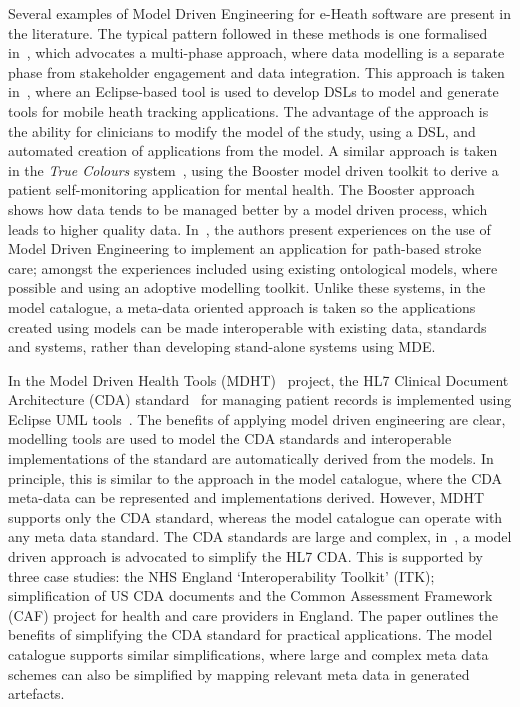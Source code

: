 Several examples of Model Driven Engineering for e-Heath software are present in the literature. The typical pattern followed in these methods is one formalised in~\cite{pay12}, which advocates a multi-phase approach, where data modelling is a separate phase from stakeholder engagement and data integration. This approach is taken in~\cite{kham08}, where an Eclipse-based tool is used to develop DSLs to model and generate tools for mobile heath tracking applications. The advantage of the approach is the ability for clinicians to modify the model of the study, using a DSL, and automated creation of applications from the model. A similar approach is taken in the \emph{True Colours} system~\cite{dav14}, using the Booster model driven toolkit to derive a patient self-monitoring application for mental health. The Booster approach shows how data tends to be managed better by a model driven process, which leads to higher quality data. In~\cite{schl15}, the authors present experiences on the use of Model Driven Engineering to implement an application for path-based stroke care; amongst the experiences included using existing ontological models, where possible and using an adoptive modelling toolkit. Unlike these systems, in the model catalogue, a meta-data oriented approach is taken so the applications created using models can be made interoperable with existing data, standards and systems, rather than developing stand-alone systems using MDE. 



In the Model Driven Health Tools (MDHT)~\cite{MDHT} project, the HL7 Clinical Document Architecture (CDA) standard~\cite{doli06} for managing patient records is implemented using Eclipse UML tools~\cite{EUML}. The benefits of applying model driven engineering are clear, modelling tools are used to model the CDA standards and interoperable implementations of the standard are automatically derived from the models. In principle, this is similar to the approach in the model catalogue, where the CDA meta-data can be represented and implementations derived. However, MDHT supports only the CDA standard, whereas the model catalogue can operate with any meta data standard. The CDA standards are large and complex, in~\cite{sco12}, a model driven approach is advocated to simplify the HL7 CDA. This is supported by three case studies: the NHS England ‘Interoperability Toolkit’ (ITK); simplification of US CDA documents and the Common Assessment Framework (CAF) project for health and care providers in England. The paper outlines the benefits of simplifying the CDA standard for practical applications. The model catalogue supports similar simplifications, where large and complex meta data schemes can also be simplified by mapping relevant meta data in generated artefacts.


